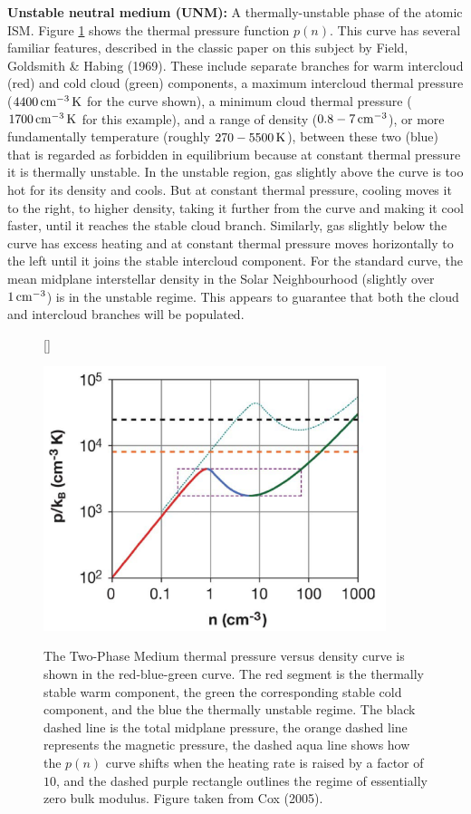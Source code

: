 \documentclass[a4paper,10pt]{article}
\begin{document}
{\noindent}\textbf{Unstable neutral medium (UNM):} A thermally-unstable phase of the atomic ISM. Figure \ref{fig:pressure-density} shows the thermal pressure function $p(n)$. This curve has several familiar features, described in the classic paper
on this subject by Field, Goldsmith \& Habing (1969). These include separate branches for warm intercloud (red) and cold cloud (green) components, a maximum intercloud thermal pressure ($4400\,{\rm cm^{-3}\,K}$ for the curve shown), a minimum cloud thermal pressure ($1700\,{\rm cm^{-3}\,K}$ for this example), and a range of density ($0.8-7\,{\rm cm^{-3}}$), or more fundamentally temperature (roughly $270-5500\,{\rm K}$), between these two (blue) that is regarded as forbidden in equilibrium because at constant thermal pressure it is thermally unstable. In the unstable region, gas slightly above the curve is too hot for its density and cools. But at constant thermal pressure, cooling moves it to the right, to higher density, taking it further from the curve and making it cool faster, until it reaches the stable cloud branch. Similarly, gas slightly below the curve has excess heating and at constant thermal pressure moves horizontally to the left until it joins the stable intercloud component. For the standard curve, the mean midplane interstellar density in the Solar Neighbourhood (slightly over $1\,{\rm cm^{-3}}$) is in the unstable regime. This appears to guarantee that both the cloud and intercloud branches will be populated.

\begin{figure}[h]
    [\FBwidth]
    {\caption{\footnotesize{The Two-Phase Medium thermal pressure versus density curve is shown in the red-blue-green curve. The red segment is the thermally stable warm component, the green the corresponding stable cold component, and the blue the thermally unstable regime. The black dashed line is the total midplane pressure, the orange dashed line represents the magnetic pressure, the dashed aqua line shows how the $p(n)$ curve shifts when the heating rate is raised by a factor of $10$, and the dashed purple rectangle outlines the regime of essentially zero bulk modulus. Figure taken from Cox (2005).}}
    \label{fig:pressure-density}}
    {\includegraphics[width=10cm]{figures/pressure-density.png}}
\end{figure}
\end{document}
